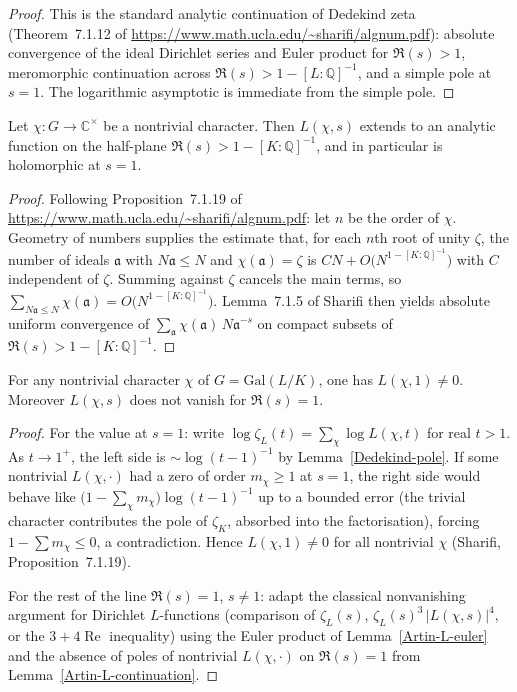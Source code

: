 \begin{proof}
This is the standard analytic continuation of Dedekind zeta (Theorem~7.1.12 of
\url{https://www.math.ucla.edu/~sharifi/algnum.pdf}): absolute convergence of the ideal
Dirichlet series and Euler product for $\Re(s)>1$, meromorphic continuation across
$\Re(s)>1-[L:\mathbb{Q}]^{-1}$, and a simple pole at $s=1$.  The logarithmic asymptotic is
immediate from the simple pole.
\end{proof}
\begin{lemma}\label{Artin-L-continuation}
Let $\chi : G \to \mathbb{C}^\times$ be a nontrivial character.  Then $L(\chi,s)$ extends to an
analytic function on the half-plane $\Re(s) > 1 - [K:\mathbb{Q}]^{-1}$, and in particular is
holomorphic at $s=1$.
\end{lemma}
\begin{proof}
Following Proposition~7.1.19 of \url{https://www.math.ucla.edu/~sharifi/algnum.pdf}: let $n$
be the order of $\chi$.  Geometry of numbers supplies the estimate that, for each $n$th root of
unity $\zeta$, the number of ideals $\mathfrak{a}$ with $N\mathfrak{a} \leq N$ and
$\chi(\mathfrak{a})=\zeta$ is $CN + O\bigl(N^{1-[K:\mathbb{Q}]^{-1}}\bigr)$ with $C$ independent of
$\zeta$.  Summing against $\zeta$ cancels the main terms, so
$\sum_{N\mathfrak{a}\leq N} \chi(\mathfrak{a}) = O\bigl(N^{1-[K:\mathbb{Q}]^{-1}}\bigr)$.
Lemma~7.1.5 of Sharifi then yields absolute uniform convergence of
$\sum_{\mathfrak{a}} \chi(\mathfrak{a})\, N\mathfrak{a}^{-s}$ on compact subsets of
$\Re(s) > 1 - [K:\mathbb{Q}]^{-1}$.
\end{proof}
\begin{lemma}\label{Dedekind-nonvanishing}
For any nontrivial character $\chi$ of $G = \mathrm{Gal}(L/K)$, one has $L(\chi,1) \neq 0$.
Moreover $L(\chi,s)$ does not vanish for $\Re(s)=1$.
\end{lemma}
\begin{proof}
For the value at $s=1$: write $\log\zeta_L(t) = \sum_\chi \log L(\chi,t)$ for real $t>1$.
As $t\to 1^+$, the left side is $\sim \log(t-1)^{-1}$ by Lemma~\ref{Dedekind-pole}.  If some
nontrivial $L(\chi,\cdot)$ had a zero of order $m_\chi \geq 1$ at $s=1$, the right side would
behave like $\bigl(1 - \sum_\chi m_\chi\bigr)\log(t-1)^{-1}$ up to a bounded error
(the trivial character contributes the pole of $\zeta_K$, absorbed into the factorisation),
forcing $1-\sum m_\chi \leq 0$, a contradiction.  Hence $L(\chi,1)\neq 0$ for all nontrivial
$\chi$ (Sharifi, Proposition~7.1.19).

For the rest of the line $\Re(s)=1$, $s\neq 1$: adapt the classical nonvanishing argument for
Dirichlet $L$-functions (comparison of $\zeta_L(s)$, $\zeta_L(s)^3\,|L(\chi,s)|^4$, or the
$3+4\operatorname{Re}$ inequality) using the Euler product of Lemma~\ref{Artin-L-euler} and the
absence of poles of nontrivial $L(\chi,\cdot)$ on $\Re(s)=1$ from
Lemma~\ref{Artin-L-continuation}.
\end{proof}
